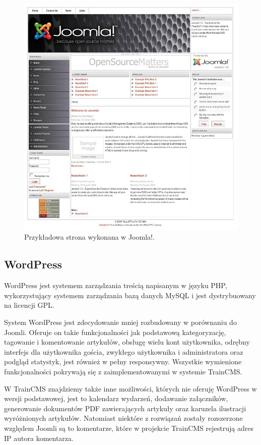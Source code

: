 \documentclass[openright]{xmgr}
\begin{document}
\begin{figure}[!tbh]
\centering
\includegraphics[width=\linewidth]{fig/joomla}
\caption{Przykładowa strona wykonana w Joomla!.}
\end{figure}

\newpage

\subsection{WordPress}

WordPress jest systemem zarządzania treścią napisanym w języku PHP, wykorzystujący systemem zarządzania bazą danych MySQL i jest dystrybuowany na licencji GPL.

System WordPress jest zdecydowanie mniej rozbudowany w porównaniu do Joomli. Oferuje on takie funkcjonalności jak podstawową kategoryzację, tagowanie i komentowanie artykułów, obsługę wielu kont użytkownika, odrębny interfejs dla użytkownika gościa, zwykłego użytkownika i administratora oraz podgląd statystyk, jest również w pełny responsywny. Wszystkie wymienione funkcjonalności pokrywają się z zaimplementowanymi w systemie TrainCMS.

W TrainCMS znajdziemy także inne możliwości, których nie oferuję WordPress w wersji podstawowej, jest to kalendarz wydarzeń, dodawanie załączników, generowanie dokumentów PDF zawierających artykuły oraz karuzela ilustracji wyróżnionych artykułów. Natomiast niektóre z rozwiązań zostały rozszerzone względem Joomli są to komentarze, które w projekcie TrainCMS rejestrują adres IP autora komentarza.
\end{document}
